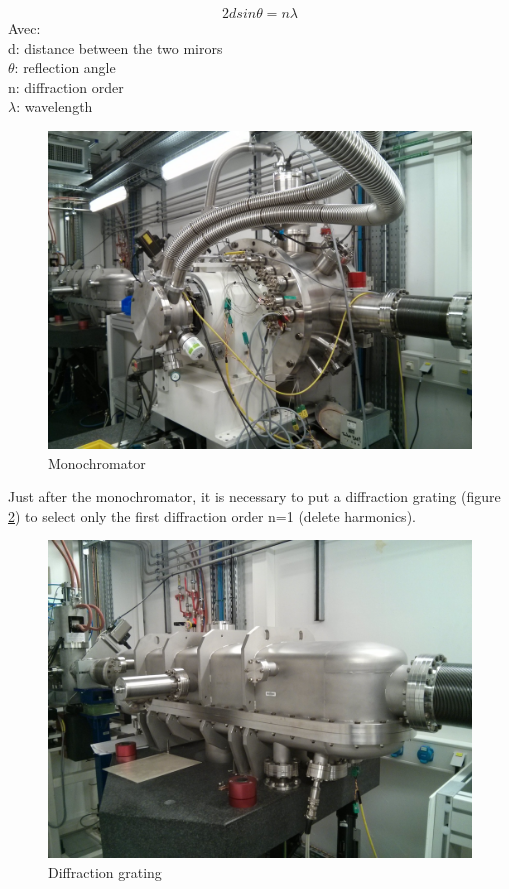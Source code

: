 \documentclass[11pt,a4paper,oneside]{report}
\begin{document}
\begin{equation}
    2d sin \theta = n \lambda  \label{Bragg}
\end{equation}
Avec:\\
d: distance between the two mirors\\
$\theta$: reflection angle\\
n: diffraction order\\
$\lambda$: wavelength\\
\medskip
\begin{figure}[H]
    \begin{center}
        \includegraphics[scale=0.13]{Images/IMG_20151210_202721.jpg}
        \caption{Monochromator}
        \label{monochromateur}
    \end{center}
\end{figure}
\medskip

Just after the monochromator, it is necessary to put a diffraction grating (figure \ref{Reseau_diffract}) to select only the first diffraction order n=1 (delete harmonics).

\begin{figure}[H]
    \begin{center}
        \includegraphics[scale=0.11]{Images/IMG_20151210_202740.jpg}
        \caption{Diffraction grating}
        \label{Reseau_diffract}
    \end{center}
\end{figure}
\medskip
\end{document}

